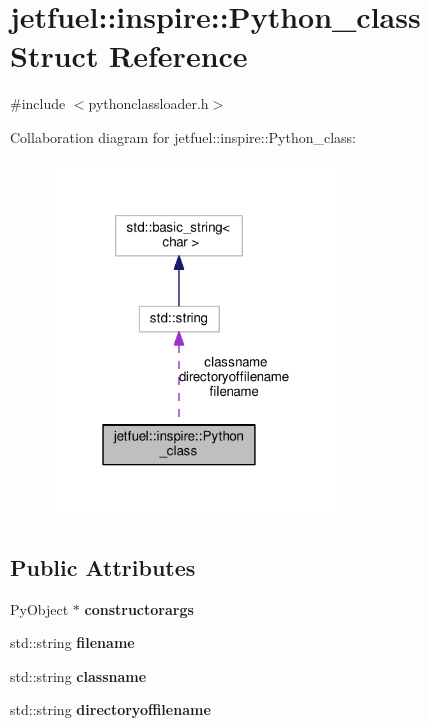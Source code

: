 \hypertarget{structjetfuel_1_1inspire_1_1Python__class}{}\section{jetfuel\+:\+:inspire\+:\+:Python\+\_\+class Struct Reference}
\label{structjetfuel_1_1inspire_1_1Python__class}


{\ttfamily \#include $<$pythonclassloader.\+h$>$}



Collaboration diagram for jetfuel\+:\+:inspire\+:\+:Python\+\_\+class\+:
\nopagebreak
\begin{figure}[H]
\begin{center}
\leavevmode
\includegraphics[width=220pt]{structjetfuel_1_1inspire_1_1Python__class__coll__graph}
\end{center}
\end{figure}
\subsection*{Public Attributes}
\begin{DoxyCompactItemize}
\item 
\mbox{\label{structjetfuel_1_1inspire_1_1Python__class_ace064af1cb731082b6b28cd0c7fbf354}} 
Py\+Object $\ast$ {\bfseries constructorargs}
\item 
\mbox{\label{structjetfuel_1_1inspire_1_1Python__class_ac2ae44bee8c12dc57d0e3b7b816dc14e}} 
std\+::string {\bfseries filename}
\item 
\mbox{\label{structjetfuel_1_1inspire_1_1Python__class_a44270e68f3642d9a268ff4ae726e65f0}} 
std\+::string {\bfseries classname}
\item 
\mbox{\label{structjetfuel_1_1inspire_1_1Python__class_a5ce967f2eb9997141355a6eb05113063}} 
std\+::string {\bfseries directoryoffilename}
\end{DoxyCompactItemize}


